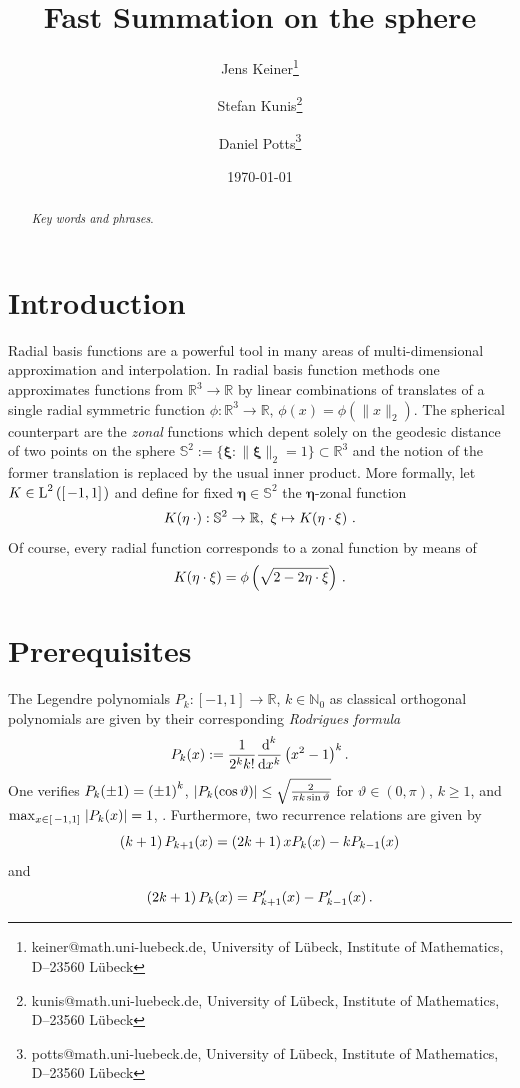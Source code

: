 \documentclass[11pt,a4paper,twoside,bibtotoc]{scrartcl}
\title{
Fast Summation on the sphere}
\date{\today}
\author{
Jens Keiner\thanks{keiner@math.uni-luebeck.de, University of
  L\"ubeck, Institute of Mathematics, D--23560 L\"ubeck} \and
Stefan Kunis\thanks{kunis@math.uni-luebeck.de, University of
  L\"ubeck, Institute of Mathematics, D--23560 L\"ubeck} \and
Daniel Potts\thanks{potts@math.uni-luebeck.de, University of
  L\"ubeck, Institute of Mathematics, D--23560 L\"ubeck} 
}
\theoremstyle{plain}
\theoremstyle{definition}
\theoremstyle{remark}
\newcommand{\N}{\ensuremath{\mathbb{N}}}
\newcommand{\R}{\ensuremath{\mathbb{R}}}
\newcommand{\abs}[1]{\ensuremath{\left\vert#1\right\vert}}
\newcommand{\twosphere}{\ensuremath{\mathbb{S}^2}}
\newcommand{\Ln}[2]{\ensuremath{\text{\rm{L}}^{#1}\left(#2\right)}}
\newcommand{\interv}[4]{\ensuremath{\left#1\left.#2,#3\right#4\right.}}
\newcommand{\fun}[2]{\ensuremath{#1{\hspace{-0.4ex}}\left(#2\right)}}
\newcommand{\paren}[1]{\ensuremath{\left(#1\right)}}
\newcommand{\mb}[1]{\mathbf{#1}}
\newcommand{\V}[1]{\mb{#1}}
\newcommand{\dx}{\text{\rm{d}}}
\numberwithin{equation}{section}
\numberwithin{table}{section}
\numberwithin{figure}{section}
\begin{document}
\maketitle

\begin{abstract}
\medskip


\noindent
{\it Key words and phrases}.  
\end{abstract}

\section{Introduction}
\label{sect:1}
Radial basis functions are a powerful tool in many areas of multi-dimensional 
approximation and interpolation.
In radial basis function methods one approximates functions from $\R^3
\rightarrow \R$ by linear combinations of translates of a single radial 
symmetric function $\phi:\R^3 \rightarrow \R, \, \phi(x)=\phi(\|x\|_2)$.
The spherical counterpart are the \emph{zonal} functions which depent solely
on the geodesic distance of two points on the sphere $\twosphere:=\{
\V{\xi}: \|\V{\xi}\|_2=1\} \subset \R^3$ and the notion of the former
translation is replaced by the usual inner product.
More formally, let $K \in \Ln{2}{\interv{[}{-1}{1}{]}}$ and define for fixed
$\V{\eta} \in \twosphere$ the $\V{\eta}$-zonal function 
\[
  \fun{K}{\V{\eta} \: \cdot}: \twosphere \rightarrow \R,\ \V{\xi} \mapsto
  \fun{K}{\V{\eta} \cdot \V{\xi}}\,.%
\]
Of course, every radial function corresponds to a zonal function by means of
\[
  \fun{K}{\V{\eta} \cdot \V{\xi}} = \phi\left(\sqrt{2-2\V{\eta} \cdot
  \V{\xi}}\right)\,.
\]

\section{Prerequisites}
\label{sect:2}
The Legendre polynomials $P_k : \interv{[}{-1}{1}{]} \rightarrow \R$, $k \in
\N_{0}$ as classical orthogonal polynomials are given by their corresponding
\emph{Rodrigues formula}
\[
\fun{P_k}{x} := \frac{1}{2^k k!} \frac{\dx^k}{\dx x^k} \paren{x^2-1}^k.
\]
One verifies $\fun{P_{k}}{\pm1} = \paren{\pm1}^{k}$, $\left|\fun{P_{k}}{\cos\vartheta}\right|
\le \sqrt{\frac{2}{\pi k \sin\vartheta}}$ for $\vartheta \in (0,\pi)$, $k \ge 1$, 
and $\max_{x \in \interv{[}{-1}{1}{]}} \abs{\fun{P_{k}}{x}} = 1$, 
\cite[pp. 47]{niuv}.
Furthermore, two recurrence relations are given by
\begin{equation}\label{three1}
\paren{k+1}\fun{P_{k+1}}{x} = \paren{2k+1}x\fun{P_{k}}{x} - k\fun{P_{k-1}}{x}
\end{equation}
and
\begin{equation}\label{three2}
\paren{2k+1} \fun{P_{k}}{x} = \fun{P_{k+1}'}{x} - \fun{P_{k-1}'}{x}.
\end{equation}
\end{document}
